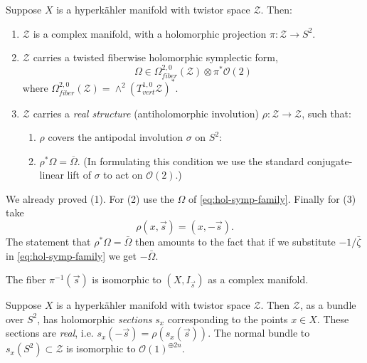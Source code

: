\documentclass[12pt,letterpaper,reqno]{article}
\numberwithin{equation}{section}
\newcommand{\cZ}{\ensuremath{\mathcal Z}}
\newcommand{\cO}{\ensuremath{\mathcal O}}
\newcommand{\hk}{hyperk\"ahler\xspace}
\newcommand{\ti}[1]{\textit{#1}}
\begin{document}
\begin{prop} \label{prop:twistor-space-properties}
Suppose $X$ is a \hk manifold with twistor space $\cZ$. Then:
\begin{enumerate}
\item $\cZ$ is a complex manifold, with a
  holomorphic projection $\pi: \cZ \to S^2$.
\item $\cZ$ carries a twisted fiberwise holomorphic symplectic form,
\begin{equation}
  \Omega \in \Omega^{2,0}_{fiber}(\cZ) \otimes \pi^* \cO(2)
\end{equation}
where $\Omega^{2,0}_{fiber}(\cZ) = \wedge^2 (T^{1,0}_{vert} \cZ)^*$.
\item $\cZ$ carries a \ti{real structure} (antiholomorphic involution)
$\rho: \cZ \to \cZ$, such that:
\begin{enumerate}
\item $\rho$ covers the antipodal involution $\sigma$ on $S^2$:
\begin{center}
\end{center}
\item $\rho^* \Omega = \overline\Omega$.
(In formulating this condition we use the standard
conjugate-linear lift of $\sigma$ to act on $\cO(2)$.)
\end{enumerate}
\end{enumerate}
\end{prop}

\begin{pf}
We already proved (1).
For (2) use the $\Omega$ of \eqref{eq:hol-symp-family}.
Finally for (3) take
\begin{equation}
  \rho(x, \vec s) = (x, - \vec s).
\end{equation}
The statement that $\rho^* \Omega = \bar\Omega$ then
amounts to the fact that if we substitute $- 1 / \bar\zeta$
in \eqref{eq:hol-symp-family} we get $-\bar\Omega$.
\end{pf}

The fiber $\pi^{-1}(\vec s)$ is isomorphic to
$(X,I_{\vec s})$ as a complex manifold.

\begin{prop}
Suppose $X$ is a \hk manifold with twistor space $\cZ$.
Then
$\cZ$, as a bundle over $S^2$,
has holomorphic \ti{sections} $s_x$ corresponding
to the points $x \in X$.
These sections are \ti{real}, i.e. $s_x(-\vec s) = \rho(s_x(\vec s))$.
The normal bundle to $s_x(S^2) \subset \cZ$ is isomorphic
to $\cO(1)^{\oplus 2n}$.
\end{prop}
\end{document}
